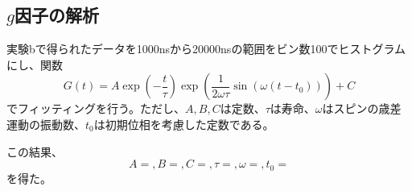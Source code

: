 \subsection{$g$因子の解析}
実験bで得られたデータを1000nsから20000nsの範囲をビン数100でヒストグラムにし、関数
\begin{equation}
G(t)=A\exp\left(-\frac{t}{\tau}\right)\exp\left(\frac{1}{2\omega\tau}\sin(\omega(t-t_0))\right)+C
\label{eq:g-fit}
\end{equation}
でフィッティングを行う。ただし、$A,B,C$は定数、$\tau$は寿命、$\omega$はスピンの歳差運動の振動数、$t_0$は初期位相を考慮した定数である。


この結果、
\begin{equation}
A= ,B= ,C= ,\tau= ,\omega= ,t_0=
\end{equation}
を得た。
